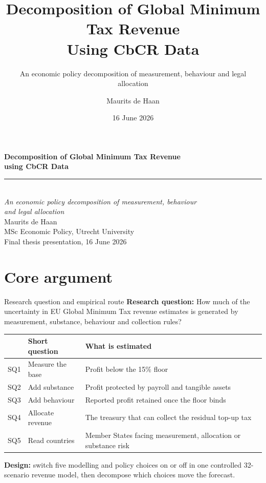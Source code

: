 \documentclass[aspectratio=169, 11pt]{beamer}
\title{Decomposition of Global Minimum Tax Revenue\\Using CbCR Data}
\subtitle{An economic policy decomposition of measurement, behaviour and legal allocation}
\author{Maurits de Haan}
\institute{MSc Economic Policy, Utrecht University School of Economics}
\date{16 June 2026}
\newcommand{\emphbx}[1]{\textcolor{Bordeaux}{\textbf{#1}}}
\begin{document}
{
\begin{frame}[plain]
  \vspace{1.25em}
  \begin{center}
    {\color{Ivory}\Large\bfseries Decomposition of Global Minimum Tax Revenue}\\[0.25em]
    {\color{Ivory}\Large\bfseries using CbCR Data}\\[0.8em]
    {\color{DkOrange}\rule{6.4cm}{2pt}}\\[0.8em]
    {\color{LtOrange}\normalsize\itshape An economic policy decomposition of measurement, behaviour\\[0.15em]
     and legal allocation}\\[1.55em]
    {\color{Ivory}\normalsize Maurits de Haan}\\[0.3em]
    {\color{WarmGrey}\small MSc Economic Policy, Utrecht University}\\[0.25em]
    {\color{MidGrey}\small Final thesis presentation, 16 June 2026}
  \end{center}
\end{frame}
}

\section{Core argument}

\begin{frame}{Research question and empirical route}
\footnotesize
\textbf{Research question:} How much of the uncertainty in EU Global Minimum Tax revenue estimates is generated by measurement, substance, behaviour and collection rules?

\vspace{0.25em}
\begin{center}
\scriptsize
\setlength{\tabcolsep}{4pt}
\begin{tabular}{@{}C{0.85cm}L{2.75cm}L{6.85cm}@{}}
  \toprule
  & Short question & What is estimated \\
  \midrule
  SQ1 & Measure the base & Profit below the 15\% floor \\
  SQ2 & Add substance & Profit protected by payroll and tangible assets \\
  SQ3 & Add behaviour & Reported profit retained once the floor binds \\
  SQ4 & Allocate revenue & The treasury that can collect the residual top-up tax \\
  SQ5 & Read countries & Member States facing measurement, allocation or substance risk \\
  \bottomrule
\end{tabular}
\end{center}

\vspace{0.25em}
\centering
\emphbx{Design:} switch five modelling and policy choices on or off in one controlled 32-scenario revenue model, then decompose which choices move the forecast.
\end{frame}
\end{document}
